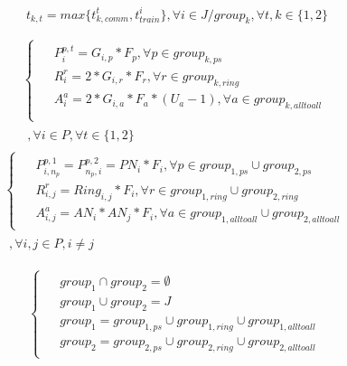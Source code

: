 \documentclass[conference]{IEEEtran}
\begin{document}
\begin{equation}
	t_{k,t} = max\{t_{k, comm}^{t}, t_{train}^i\}, \forall i \in J/group_k, \forall t,k \in \{1,2\}
\end{equation}

\begin{equation}
	\begin{split}
		\begin{cases}
			\begin{aligned}
				& P_{i}^{p,t} = G_{i,p} * F_{p}, \forall p\in group_{k,ps}\\
				& R_{i}^{r} = 2 * G_{i,r} * F_{r}, \forall r\in group_{k,ring}\\
				& A_{i}^{a} = 2 * G_{i,a} * F_{a} * (U_{a} - 1), \forall a\in group_{k,alltoall}\\
			\end{aligned}
		\end{cases}\\
		\begin{aligned}
			,\forall i\in P,\forall t\in\{1,2\}
		\end{aligned}
	\end{split}
\end{equation}
\begin{equation}
	\begin{split}
		\begin{cases}
			\begin{aligned}
				& P_{i,n_p}^{p,1} = P_{n_p,i}^{p,2} = PN_i * F_i, \forall p \in group_{1,ps}\cup group_{2,ps}\\
				& R_{i,j}^{r} = Ring_{i,j} * F_i, \forall r \in group_{1,ring}\cup group_{2,ring}\\
				& A_{i,j}^a = AN_i * AN_j * F_i, \forall a \in group_{1,alltoall}\cup group_{2,alltoall}
			\end{aligned}
		\end{cases}\\
		\begin{aligned}
			,\forall i,j\in P,i\neq j
		\end{aligned}
	\end{split}
\end{equation}

\begin{equation}
	\begin{cases}
		\begin{aligned}
			& group_1 \cap group_2 = \emptyset \\
			& group_1 \cup group_2 = J \\
			& group_1 = group_{1,ps} \cup group_{1,ring} \cup group_{1, alltoall}\\
			& group_2 = group_{2,ps} \cup group_{2,ring} \cup group_{2, alltoall}
		\end{aligned}
	\end{cases}
\end{equation}
\end{document}
